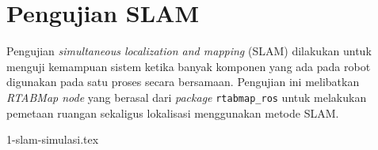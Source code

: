 \section{Pengujian SLAM}
\label{sec:pengujianslam}

Pengujian \emph{simultaneous localization and mapping} (SLAM) dilakukan untuk menguji kemampuan sistem ketika banyak komponen yang ada pada robot digunakan pada satu proses secara bersamaan.
Pengujian ini melibatkan \emph{RTABMap node} yang berasal dari \emph{package} \lstinline{rtabmap_ros} untuk melakukan pemetaan ruangan sekaligus lokalisasi menggunakan metode SLAM.

{1-slam-simulasi.tex}
